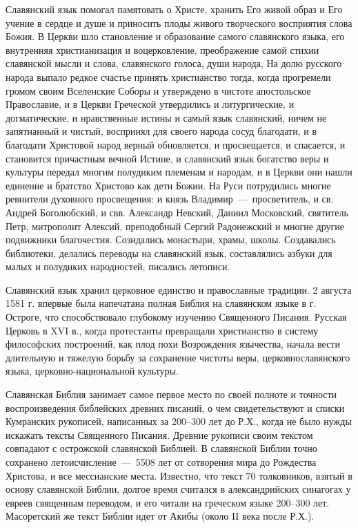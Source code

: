 \documentclass[11pt,a4paper,oneside]{memoir}
\begin{document}
    Славянский язык помогал памятовать о Христе, хранить Его живой образ и Его учение в сердце и душе и приносить плоды живого творческого восприятия слова Божия. В Церкви шло становление и образование самого славянского языка, его внутренняя христианизация и воцерковление, преображение самой стихии славянской мысли и слова, славянского голоса, души народа, На долю русского народа выпало редкое счастье принять христианство тогда, когда прогремели громом своим Вселенские Соборы и утверждено в чистоте апостольское Православие, и в Церкви Греческой утвердились и литургические, и догматические, и нравственные истины и самый язык славянский, ничем не запятнанный и чистый, воспринял для своего народа сосуд благодати, и в благодати Христовой народ верный обновляется, и просвещается, и спасается, и становится причастным вечной Истине, и славянский язык богатство веры и культуры передал многим полудиким племенам и народам, и в Церкви они нашли единение и братство Христово как дети Божии. На Руси потрудились многие ревнители духовного просвещения: и князь Владимир~---~просветитель, и св. Андрей Боголюбский, и свв. Александр Невский, Даниил Московский, святитель Петр, митрополит Алексий, преподобный Сергий Радонежский и многие другие подвижники благочестия. Созидались монастыри, храмы, школы. Создавались библиотеки, делались переводы на славянский язык, составлялись азбуки для малых и полудиких народностей, писались летописи.
    
    Славянский язык хранил церковное единство и православные традиции. 2 августа 1581 г. впервые была напечатана полная Библия на славянском языке в г. Остроге, что способствовало глубокому изучению Священного Писания. Русская Церковь в XVI в., когда протестанты превращали христианство в систему философских построений, как плод похи Возрождения язычества, начала вести длительную и тяжелую борьбу за сохранение чистоты веры, церковнославянского языка, церковно-национальной культуры.
    
    Славянская Библия занимает самое первое место по своей полноте и точности воспроизведения библейских древних писаний, о чем свидетельствуют и списки Кумранских рукописей, написанных за 200--300 лет до Р.Х., когда не было нужды искажать тексты Священного Писания. Древние рукописи своим текстом совпадают с острожской славянской Библией. В славянской Библии точно сохранено летоисчисление~---~5508 лет от сотворения мира до Рождества Христова, и все мессианские места. Известно, что текст 70 толковников, взятый в основу славянской Библии, долгое время считался в александрийских синагогах у евреев священным переводом, и его читали на греческом языке 200--300 лет. Масоретский же текст Библии идет от Акибы (около II века после Р.Х.).
    
\end{document}
